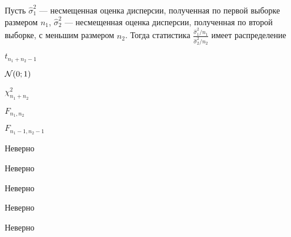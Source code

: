 
\begin{question}
Пусть \(\hat{\sigma}^2_1\) --- несмещенная оценка дисперсии, полученная
по первой выборке размером \(n_1\), \(\hat{\sigma}^2_2\) --- несмещенная
оценка дисперсии, полученная по второй выборке, с меньшим размером
\(n_2\). Тогда статистика
\(\frac{\hat{\sigma}^2_1/n_1}{\hat{\sigma}^2_2/n_2}\) имеет
распределение
\begin{answerlist}
  \item \(t_{n_1+n_2-1}\)
  \item \(\mathcal{N}(0;1)\)
  \item \(\chi^2_{n_1+n_2}\)
  \item \(F_{n_1,n_2}\)
  \item \(F_{n_1-1,n_2-1}\)
\end{answerlist}
\end{question}

\begin{solution}
\begin{answerlist}
  \item Неверно
  \item Неверно
  \item Неверно
  \item Неверно
  \item Неверно
\end{answerlist}
\end{solution}

